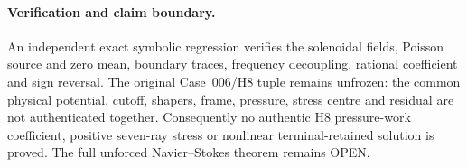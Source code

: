 \paragraph{Verification and claim boundary.}
An independent exact symbolic regression verifies the solenoidal
fields, Poisson source and zero mean, boundary traces, frequency
decoupling, rational coefficient and sign reversal. The original
Case~006/H8 tuple remains unfrozen: the common physical potential,
cutoff, shapers, frame, pressure, stress centre and residual are not
authenticated together. Consequently no authentic H8 pressure-work
coefficient, positive seven-ray stress or nonlinear terminal-retained
solution is proved. The full unforced Navier--Stokes theorem remains OPEN.
